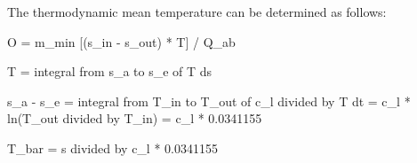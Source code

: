 The thermodynamic mean temperature can be determined as follows:  

O = m_min [(s_in - s_out) * T] / Q_ab  

T = integral from s_a to s_e of T ds  

s_a - s_e = integral from T_in to T_out of c_l divided by T dt = c_l * ln(T_out divided by T_in) = c_l * 0.0341155  

T_bar = s divided by c_l * 0.0341155